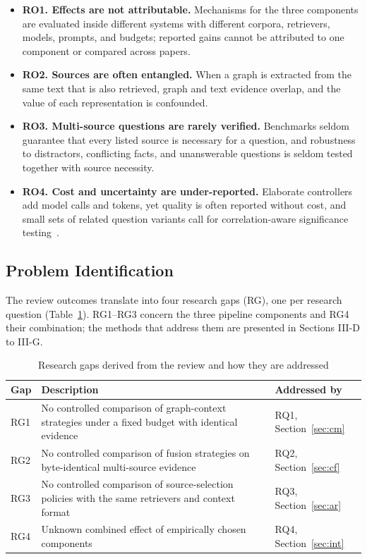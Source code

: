 \documentclass[conference]{IEEEtran}
\begin{document}
\begin{itemize}
\item \textbf{RO1. Effects are not attributable.} Mechanisms for the three components are evaluated inside different systems with different corpora, retrievers, models, prompts, and budgets; reported gains cannot be attributed to one component or compared across papers.
\item \textbf{RO2. Sources are often entangled.} When a graph is extracted from the same text that is also retrieved, graph and text evidence overlap, and the value of each representation is confounded.
\item \textbf{RO3. Multi-source questions are rarely verified.} Benchmarks seldom guarantee that every listed source is necessary for a question, and robustness to distractors, conflicting facts, and unanswerable questions is seldom tested together with source necessity.
\item \textbf{RO4. Cost and uncertainty are under-reported.} Elaborate controllers add model calls and tokens, yet quality is often reported without cost, and small sets of related question variants call for correlation-aware significance testing~\cite{dror2018}.
\end{itemize}

\subsection{Problem Identification}

The review outcomes translate into four research gaps (RG), one per research question (Table~\ref{tab:gaps}). RG1--RG3 concern the three pipeline components and RG4 their combination; the methods that address them are presented in Sections III-D to III-G.

\begin{table}[!t]
\caption{Research gaps derived from the review and how they are addressed}
\label{tab:gaps}
\centering
\footnotesize
\setlength{\tabcolsep}{3pt}
\renewcommand{\arraystretch}{1.1}
\begin{tabular}{@{}>{\raggedright\arraybackslash}p{}>{\raggedright\arraybackslash}p{}>{\raggedright\arraybackslash}p{}@{}}
\toprule
\textbf{Gap} & \textbf{Description} & \textbf{Addressed by} \\
\midrule
RG1 & No controlled comparison of graph-context strategies under a fixed budget with identical evidence & RQ1, Section~\ref{sec:cm} \\
RG2 & No controlled comparison of fusion strategies on byte-identical multi-source evidence & RQ2, Section~\ref{sec:cf} \\
RG3 & No controlled comparison of source-selection policies with the same retrievers and context format & RQ3, Section~\ref{sec:ar} \\
RG4 & Unknown combined effect of empirically chosen components & RQ4, Section~\ref{sec:int} \\
\bottomrule
\end{tabular}
\end{table}
\end{document}

